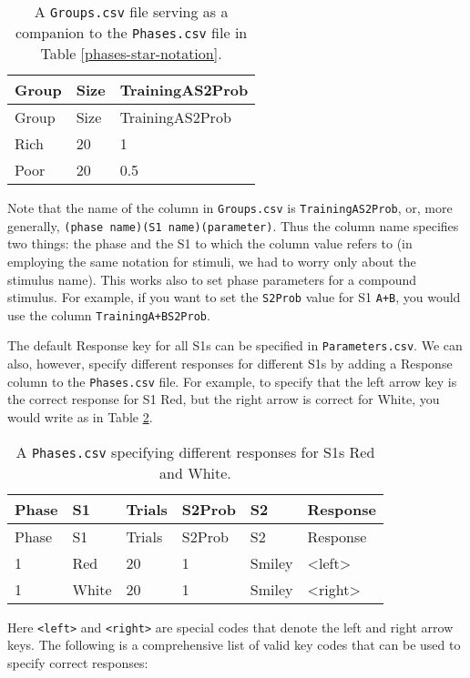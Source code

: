 \documentclass[11pt,]{article}
\begin{document}
\begin{longtable}[c]{@{}lll@{}}
\caption{A \texttt{Groups.csv} file serving as a companion to the
\texttt{Phases.csv} file in Table \ref{phases-star-notation}.
\label{groups-phases-star-notation}}\tabularnewline
\toprule
Group & Size & TrainingAS2Prob\tabularnewline
\midrule
\endfirsthead
\toprule
Group & Size & TrainingAS2Prob\tabularnewline
\midrule
\endhead
Rich & 20 & 1\tabularnewline
Poor & 20 & 0.5\tabularnewline
\bottomrule
\end{longtable}

Note that the name of the column in \texttt{Groups.csv} is
\texttt{TrainingAS2Prob}, or, more generally,
\texttt{(phase name)(S1 name)(parameter)}. Thus the column name
specifies two things: the phase and the S1 to which the column value
refers to (in employing the same notation for stimuli, we had to worry
only about the stimulus name). This works also to set phase parameters
for a compound stimulus. For example, if you want to set the
\texttt{S2Prob} value for S1 \texttt{A+B}, you would use the column
\texttt{TrainingA+BS2Prob}.


The default Response key for all S1s can be specified in
\texttt{Parameters.csv}. We can also, however, specify different
responses for different S1s by adding a Response column to the
\texttt{Phases.csv} file. For example, to specify that the left arrow
key is the correct response for S1 Red, but the right arrow is correct
for White, you would write as in Table \ref{per-stimulus-responses}.

\begin{longtable}[c]{@{}llllll@{}}
\caption{A \texttt{Phases.csv} specifying different responses for S1s
Red and White. \label{per-stimulus-responses}}\tabularnewline
\toprule
Phase & S1 & Trials & S2Prob & S2 & Response\tabularnewline
\midrule
\endfirsthead
\toprule
Phase & S1 & Trials & S2Prob & S2 & Response\tabularnewline
\midrule
\endhead
1 & Red & 20 & 1 & Smiley & \textless{}left\textgreater{}\tabularnewline
1 & White & 20 & 1 & Smiley &
\textless{}right\textgreater{}\tabularnewline
\bottomrule
\end{longtable}

Here \texttt{\textless{}left\textgreater{}} and
\texttt{\textless{}right\textgreater{}} are special codes that denote
the left and right arrow keys. The following is a comprehensive list of
valid key codes that can be used to specify correct responses:
\end{document}
